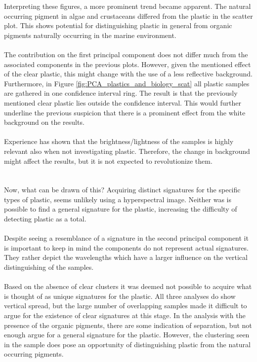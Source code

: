 \noindent
Interpreting these figures, a more prominent trend became apparent. The natural occurring pigment in algae and crustaceans differed from the plastic in the scatter plot. This shows potential for distinguishing plastic in general from organic pigments naturally occurring in the marine environment.
\\\\%
The contribution on the first principal component does not differ much from the associated components in the previous plots. However, given the mentioned effect of the clear plastic, this might change with the use of a less reflective background. Furthermore, in Figure \ref{fig:PCA_plastics_and_biology_scat} all plastic samples are gathered in one confidence interval ring. The result is that the previously mentioned clear plastic lies outside the confidence interval. This would further underline the previous suspicion that there is a prominent effect from the white background on the results.
\\\\
Experience has shown that the brightness/lightness of the samples is highly relevant also when not investigating plastic. Therefore, the change in background might affect the results, but it is not expected to revolutionize them.
\\\\\\
Now, what can be drawn of this? Acquiring distinct signatures for the specific types of plastic, seems unlikely using a hyperspectral image. Neither was is possible to find a general signature for the plastic, increasing the difficulty of detecting plastic as a total. %
\\\\
Despite seeing a resemblance of a signature in the second principal component it is important to keep in mind the components do not represent actual signatures. They rather depict the wavelengths which have a larger influence on the vertical distinguishing of the samples.
\\\\
Based on the absence of clear clusters it was deemed not possible to acquire what is thought of as unique signatures for the plastic. All three analyses do show vertical spread, but the large number of overlapping samples made it difficult to argue for the existence of clear signatures at this stage. In the analysis with the presence of the organic pigments, there are some indication of separation, but not enough argue for a general signature for the plastic. However, the clustering seen in the sample does pose an opportunity of distinguishing plastic from the natural occurring pigments. 

